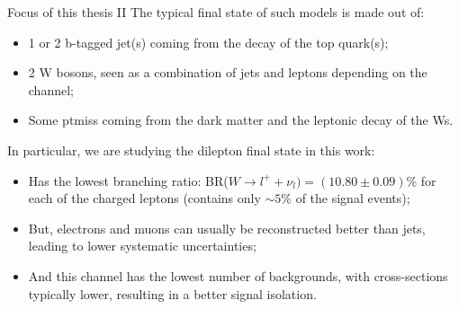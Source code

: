 \documentclass[8pt]{beamer}
\begin{document}
\begin{frame}{Focus of this thesis II}
\justifying
The \alert{typical final state} of such models is made out of:
\begin{itemize}
\justifying
\item 1 or 2 b-tagged jet(s) coming from the decay of the top quark(s);
\item 2 W bosons, seen as a combination of jets and leptons depending on the channel;
\item Some ptmiss coming from the dark matter and the leptonic decay of the Ws.
\end{itemize} \vfill

In particular, we are studying the \alert{dilepton final state} in this work: 
\begin{itemize}
\justifying
\item Has the lowest branching ratio: BR($W \rightarrow l^+ + \nu_l) = (10.80 \pm 0.09)\%$ for each of the charged leptons (contains only $\sim 5\%$ of the signal events);
\item But, electrons and muons can usually be reconstructed better than jets, leading to lower systematic uncertainties;
\item And this channel has the lowest number of backgrounds, with cross-sections typically lower, resulting in a better signal isolation.
\end{itemize} \vfill

\end{frame}
\end{document}
